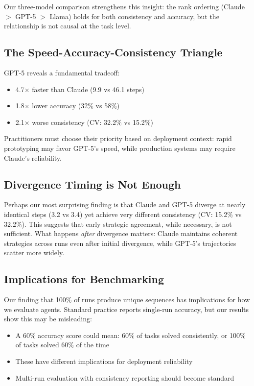 \documentclass{article}
\begin{document}
Our three-model comparison strengthens this insight: the rank ordering (Claude $>$ GPT-5 $>$ Llama) holds for both consistency and accuracy, but the relationship is not causal at the task level.

\subsection{The Speed-Accuracy-Consistency Triangle}

GPT-5 reveals a fundamental tradeoff:
\begin{itemize}
    \item 4.7$\times$ faster than Claude (9.9 vs 46.1 steps)
    \item 1.8$\times$ lower accuracy (32\% vs 58\%)
    \item 2.1$\times$ worse consistency (CV: 32.2\% vs 15.2\%)
\end{itemize}

Practitioners must choose their priority based on deployment context: rapid prototyping may favor GPT-5's speed, while production systems may require Claude's reliability.

\subsection{Divergence Timing is Not Enough}

Perhaps our most surprising finding is that Claude and GPT-5 diverge at nearly identical steps (3.2 vs 3.4) yet achieve very different consistency (CV: 15.2\% vs 32.2\%). This suggests that early strategic agreement, while necessary, is not sufficient. What happens \textit{after} divergence matters: Claude maintains coherent strategies across runs even after initial divergence, while GPT-5's trajectories scatter more widely.

\subsection{Implications for Benchmarking}

Our finding that 100\% of runs produce unique sequences has implications for how we evaluate agents. Standard practice reports single-run accuracy, but our results show this may be misleading:
\begin{itemize}
    \item A 60\% accuracy score could mean: 60\% of tasks solved consistently, or 100\% of tasks solved 60\% of the time
    \item These have different implications for deployment reliability
    \item Multi-run evaluation with consistency reporting should become standard
\end{itemize}
\end{document}
